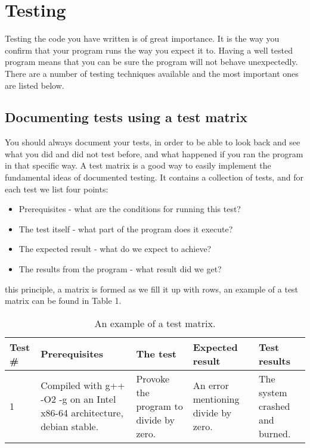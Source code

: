 \documentclass[11pt,a4paper,twoside]{article}
\begin{document}

\section{Testing}

Testing the code you have written is of great importance. It is the way you
confirm that your program runs the way you expect it to. Having a well tested
program means that you can be sure the program will not behave unexpectedly.
There are a number of testing techniques available and the most important ones
are listed below.


\subsection{Documenting tests using a test matrix}

You should always document your tests, in order to be able to look back and see
what you did and did not test before, and what happened if you ran the program
in that specific way. A test matrix is a good way to easily implement the
fundamental ideas of documented testing. It contains a collection of tests, and
for each test we list four points:

\begin{itemize}
    \item Prerequisites - what are the conditions for running this test?
    \item The test itself - what part of the program does it execute?
    \item The expected result - what do we expect to achieve?
    \item The results from the program - what result did we get?
\end{itemize}

 this principle, a matrix is formed as we fill it up with
rows, an example of a test matrix can be found in Table 1.

\begin{center}
\begin{table}[h!]
\begin{tabular}{|l|p{2.5cm}|p{2cm}|p{2.5cm}|p{2.5cm}|}
\hline
Test \# & Prerequisites & The test & Expected result & Test results \\ \hline 1
& Compiled with g++ -O2 -g on an Intel x86-64 architecture, debian stable. &
Provoke the program to divide by zero. & An error mentioning divide by zero. &
The system crashed and burned. \\
\hline
\end{tabular}
\caption{An example of a test matrix.}
\end{table}
\end{center}
\end{document}
